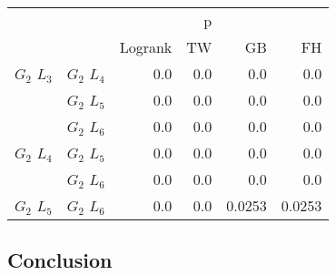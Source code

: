       \begin{table}
        \centering
        \begin{tabular}{llrrrr}
          \toprule
                       &             &         &  p &    &     \\
          \cmidrule{3-6}
                       &             & Logrank & TW & GB & FH  \\
          \midrule
          $G_2$ $L_3$  & $G_2$ $L_4$  &  0.0 &  0.0 &  0.0 &  0.0     \\
                       & $G_2$ $L_5$  & 0.0 & 0.0 & 0.0 & 0.0    \\
                       & $G_2$ $L_6$  & 0.0 & 0.0 & 0.0 & 0.0      \\
          $G_2$ $L_4$  & $G_2$ $L_5$  & 0.0 & 0.0 & 0.0 & 0.0      \\
                       & $G_2$ $L_6$  & 0.0 & 0.0 & 0.0 & 0.0       \\
          $G_2$ $L_5$   & $G_2$ $L_6$ & 0.0 & 0.0 & 0.0253 & 0.0253      \\
          \bottomrule
        \end{tabular}
        \label{tab:g2_ingroup_tests_radius}
        \caption{}
      \end{table}


      


















    


      \newpage
      
    \subsection{Conclusion}

